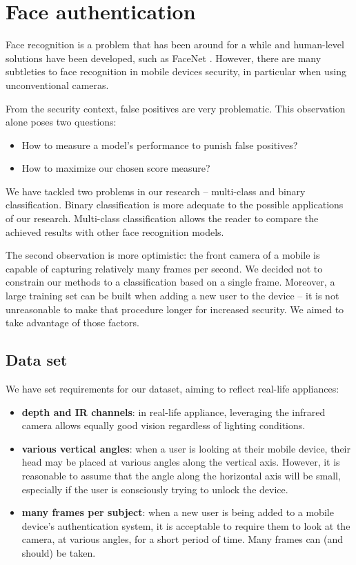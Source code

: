 \chapter{Face authentication}
    Face recognition is a problem that has been around for a while and
    human-level solutions have been developed, such as FaceNet \cite{arXiv:1503.03832}.
    However, there are many subtleties to face recognition in mobile devices
    security, in particular when using unconventional cameras.

    From the security context, false positives are very problematic. This observation alone
    poses two questions:
    \begin{itemize}
      \item How to measure a model's performance to punish false positives?
      \item How to maximize our chosen score measure?
    \end{itemize}
    We have tackled two problems in our research -- multi-class and binary classification.
    Binary classification is more adequate to the possible applications of our research.
    Multi-class classification allows the reader to compare the achieved results
    with other face recognition models.

    The second observation is more optimistic: the front camera of a mobile is capable of
    capturing relatively many frames per second. We decided not to constrain our
    methods to a classification based on a single frame.
    Moreover, a large training set can be built
    when adding a new user to the device -- it is not unreasonable to make that procedure
    longer for increased security. We aimed to take advantage of those factors.

    \section{Data set}
    We have set requirements for our dataset, aiming to reflect real-life
    appliances:
    \begin{itemize}
        \item \textbf{depth and IR channels}: in real-life appliance, leveraging
        the infrared camera allows equally good vision regardless of lighting
        conditions.
        \item \textbf{various vertical angles}: when a user is looking at their
        mobile device,
        their head may be placed at various angles along the vertical axis.
        However, it is reasonable to assume that the angle along the horizontal
        axis will be small, especially if the user is consciously trying to
        unlock the device.
        \item \textbf{many frames per subject}: when a new user is being added
        to a mobile device's authentication system, it is acceptable to require
        them to look at the camera, at various angles, for a short period of
        time. Many frames can (and should) be taken.
    \end{itemize}

